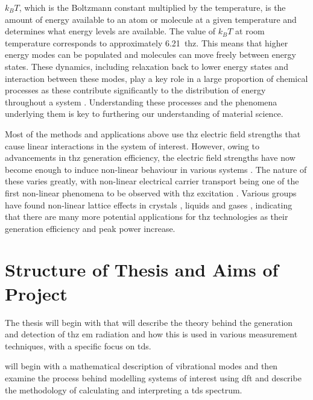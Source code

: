 \(k_BT\), which is the Boltzmann constant multiplied by the temperature, is the amount of energy available to an atom or molecule at a given temperature and determines what energy levels are available. The value of \(k_BT\) at room temperature corresponds to approximately \SI{6.21}{\acrshort{thz}}. This means that higher energy modes can be populated and molecules can move freely between energy states. These dynamics, including relaxation back to lower energy states and interaction between these modes, play a key role in a large proportion of chemical processes as these contribute significantly to the distribution of energy throughout a system \cite{Ruggiero2016, Fujisaki2005}. Understanding these processes and the phenomena underlying them is key to furthering our understanding of material science. 

Most of the methods and applications above use \acrshort{thz} electric field strengths that cause linear interactions in the system of interest. However, owing to advancements in \acrshort{thz} generation efficiency, the electric field strengths have now become enough to induce non\nobreakdash-linear behaviour in various systems \cite{Hwang2015}. The nature of these varies greatly, with non\nobreakdash-linear electrical carrier transport being one of the first non\nobreakdash-linear phenomena to be observed with \acrshort{thz} excitation \cite{Ganichev2005}. Various groups have found non\nobreakdash-linear lattice effects in crystals \cite{Hwang2015}, liquids \cite{Hoffmann2009} and gases \cite{Fleischer2012}, indicating that there are many more potential applications for \acrshort{thz} technologies as their generation efficiency and peak power increase. 

\section{Structure of Thesis and Aims of Project}
The thesis will begin with  that will describe the theory behind the generation and detection of \acrshort{thz} \acrshort{em} radiation and how this is used in various measurement techniques, with a specific focus on \acrshort{tds}.

 will begin with a mathematical description of vibrational modes and then examine the process behind modelling systems of interest using \acrfull{dft} and describe the methodology of calculating and interpreting a \acrshort{tds} spectrum.

